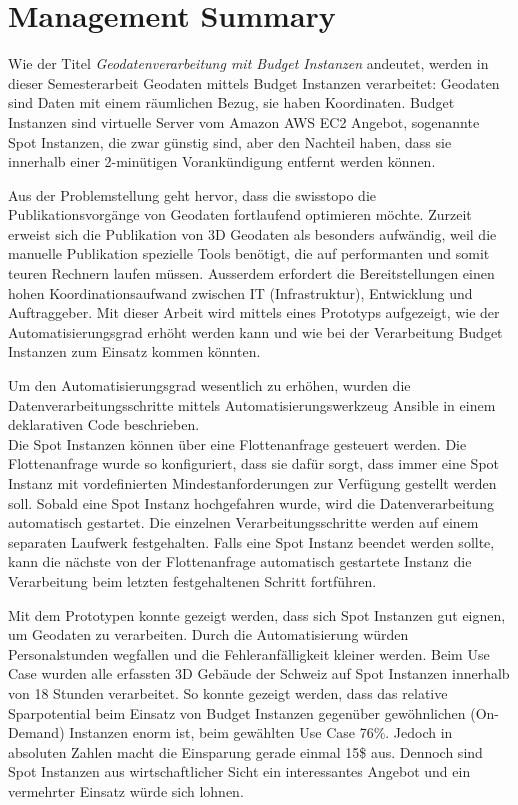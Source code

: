 \section{Management Summary}
Wie der Titel \emph{Geodatenverarbeitung mit Budget Instanzen} andeutet, werden in dieser Semesterarbeit Geodaten mittels Budget Instanzen verarbeitet: Geodaten sind Daten mit einem räumlichen Bezug, sie haben Koordinaten. Budget Instanzen sind virtuelle Server vom Amazon AWS EC2 Angebot, sogenannte Spot Instanzen, die zwar günstig sind, aber den Nachteil haben, dass sie innerhalb einer 2-minütigen Vorankündigung entfernt werden können.

Aus der Problemstellung geht hervor, dass die swisstopo die Publikationsvorgänge von Geodaten fortlaufend optimieren möchte. Zurzeit erweist sich die Publikation von 3D Geodaten als besonders aufwändig, weil die manuelle Publikation spezielle Tools benötigt, die auf performanten und somit teuren Rechnern laufen müssen. Ausserdem erfordert die Bereitstellungen einen hohen Koordinationsaufwand zwischen IT (Infrastruktur), Entwicklung und Auftraggeber.
Mit dieser Arbeit wird mittels eines Prototyps aufgezeigt, wie der Automatisierungsgrad erhöht werden kann und wie bei der Verarbeitung Budget Instanzen zum Einsatz kommen könnten.

Um den Automatisierungsgrad wesentlich zu erhöhen, wurden die Datenverarbeitungsschritte mittels Automatisierungswerkzeug Ansible in einem deklarativen Code beschrieben.\\ Die Spot Instanzen können über eine Flottenanfrage gesteuert werden. Die Flottenanfrage wurde so konfiguriert, dass sie dafür sorgt, dass immer eine Spot Instanz mit vordefinierten Mindestanforderungen zur Verfügung gestellt werden soll. Sobald eine Spot Instanz hochgefahren wurde, wird die Datenverarbeitung automatisch gestartet.
Die einzelnen Verarbeitungsschritte werden auf einem separaten Laufwerk festgehalten. Falls eine Spot Instanz beendet werden sollte, kann die nächste von der Flottenanfrage automatisch gestartete Instanz die Verarbeitung beim letzten festgehaltenen Schritt fortführen.

Mit dem Prototypen konnte gezeigt werden, dass sich Spot Instanzen gut eignen, um Geodaten zu verarbeiten. Durch die Automatisierung würden Personalstunden wegfallen und die Fehleranfälligkeit kleiner werden. Beim Use Case wurden alle erfassten 3D Gebäude der Schweiz auf Spot Instanzen innerhalb von 18 Stunden verarbeitet.
So konnte gezeigt werden, dass das relative Sparpotential beim Einsatz von Budget Instanzen gegenüber gewöhnlichen (On-Demand) Instanzen enorm ist, beim gewählten Use Case 76\%. Jedoch in absoluten Zahlen macht die Einsparung gerade einmal 15\$ aus. Dennoch sind Spot Instanzen aus wirtschaftlicher Sicht ein interessantes Angebot und ein vermehrter Einsatz würde sich lohnen.

\pagebreak